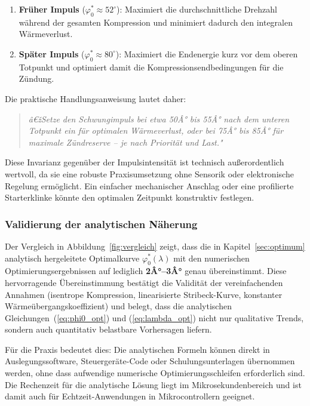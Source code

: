 ﻿\documentclass[a4paper,12pt]{article}
\begin{document}
\begin{enumerate}
  \item \textbf{Früher Impuls} ($\varphi_0^* \approx 52^\circ$): Maximiert
    die durchschnittliche Drehzahl während der gesamten Kompression und
    minimiert dadurch den integralen Wärmeverlust.
  \item \textbf{Später Impuls} ($\varphi_0^* \approx 80^\circ$): Maximiert
    die Endenergie kurz vor dem oberen Totpunkt und optimiert damit die
    Kompressionsendbedingungen für die Zündung.
\end{enumerate}

Die praktische Handlungsanweisung lautet daher:

\begin{quote}
  \textit{â€žSetze den Schwungimpuls bei etwa 50Â° bis 55Â° nach dem unteren
  Totpunkt ein für optimalen Wärmeverlust, oder bei 75Â° bis 85Â° für
  maximale Zündreserve -- je nach Priorität und Last."}
\end{quote}

Diese Invarianz gegenüber der Impulsintensität ist technisch außerordentlich
wertvoll, da sie eine robuste Praxisumsetzung ohne Sensorik oder elektronische
Regelung ermöglicht. Ein einfacher mechanischer Anschlag oder eine profilierte
Starterklinke könnte den optimalen Zeitpunkt konstruktiv festlegen.

\subsubsection*{Validierung der analytischen Näherung}

Der Vergleich in Abbildung~\ref{fig:vergleich} zeigt, dass die in
Kapitel~\ref{sec:optimum} analytisch hergeleitete Optimalkurve
$\varphi_0^*(\lambda)$ mit den numerischen Optimierungsergebnissen auf
lediglich \textbf{2Â°--3Â°} genau übereinstimmt. Diese hervorragende Übereinstimmung
bestätigt die Validität der vereinfachenden Annahmen (isentrope Kompression,
linearisierte Stribeck-Kurve, konstanter Wärmeübergangskoeffizient) und
belegt, dass die analytischen Gleichungen~(\ref{eq:phi0_opt}) und
(\ref{eq:lambda_opt}) nicht nur qualitative Trends, sondern auch quantitativ
belastbare Vorhersagen liefern.

Für die Praxis bedeutet dies: Die analytischen Formeln können direkt in
Auslegungssoftware, Steuergeräte-Code oder Schulungsunterlagen übernommen
werden, ohne dass aufwendige numerische Optimierungsschleifen erforderlich sind.
Die Rechenzeit für die analytische Lösung liegt im Mikrosekundenbereich und
ist damit auch für Echtzeit-Anwendungen in Mikrocontrollern geeignet.
\end{document}
